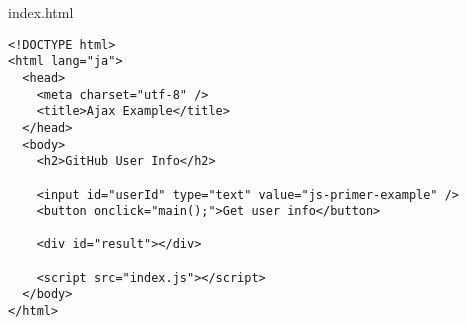 \begin{listtitle}
index.html
\end{listtitle}
\begin{lstlisting}
<!DOCTYPE html>
<html lang="ja">
  <head>
    <meta charset="utf-8" />
    <title>Ajax Example</title>
  </head>
  <body>
    <h2>GitHub User Info</h2>

    <input id="userId" type="text" value="js-primer-example" />
    <button onclick="main();">Get user info</button>

    <div id="result"></div>

    <script src="index.js"></script>
  </body>
</html>
\end{lstlisting}
\listend
